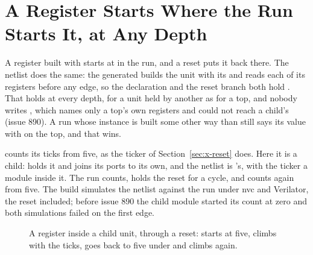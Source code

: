 \section{A Register Starts Where the Run Starts It, at Any Depth}
\label{sec:x-start}

A register built with  starts at  in the run,
and a reset puts it back there. The netlist does the same: the
generated  builds the unit with its  and
reads each of its registers before any edge, so the declaration and
the reset branch both hold . That holds at every depth, for a
unit held by another as for a top, and nobody writes
, which names only a top's own registers and could not
reach a child's (issue 890). A run whose instance is built some other
way than  still says its value with  on
the top, and that wins.

 counts its ticks from five, as the ticker of
Section~\ref{sec:x-reset} does. Here it is a child:  holds
it and joins its ports to its own, and the netlist is 's,
with the ticker a module inside it. The run counts, holds the reset
for a cycle, and counts again from five. The build simulates the
netlist against the run under nvc and Verilator, the reset included;
before issue 890 the child module started its count at zero and both
simulations failed on the first edge.

\begin{figure}[htbp]
\centering

\caption{A register inside a child unit, through a reset: 
starts at five, climbs with the ticks, goes back to five under
 and climbs again.}
\label{fig:x-start}
\end{figure}




